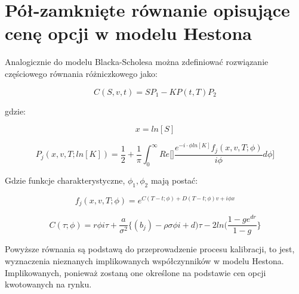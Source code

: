 \documentclass{pracamgr}
\begin{document}




\section{Pół-zamknięte równanie opisujące cenę opcji w modelu Hestona}

Analogicznie do modelu Blacka-Scholesa można zdefiniować rozwiązanie częściowego równania różniczkowego jako:

\begin{equation}
  C(S, v, t) = SP_1 -K P(t,T) P_2
\end{equation}

gdzie:

\begin{equation}
  x = ln[S]
\end{equation}

\begin{equation}
  P_j (x, v, T; ln[K]) = \frac{1}{2} + \frac{1}{\pi} \int_{0}^{\infty} Re \bigg[] \frac{e^{-i \cdot \phi ln[K]} f_j(x, v, T; \phi) }{i \phi} d \phi \bigg]
\end{equation}

Gdzie funkcje charakterystyczne, $\phi_1, \phi_2$ mają postać: 

\begin{equation}
   f_j(x, v, T; \phi) = e^{C(T-t; \phi) + D(T-t; \phi)v + i \phi x}
\end{equation}

\begin{equation}
  C (\tau; \phi) = r \phi i \tau + \frac{a}{\sigma^2} \bigg\{ (b_j) - \rho \sigma \phi i + d) \tau - 2 ln (\frac{1 - ge^{dr}}{1-g} \bigg\}
\end{equation}


Powyższe równania są podstawą do przeprowadzenie procesu kalibracji, to jest, wyznaczenia nieznanych implikowanych współczynników w modelu Hestona. 
Implikowanych, ponieważ zostaną one określone na podstawie cen opcji kwotowanych na rynku.
\end{document}
